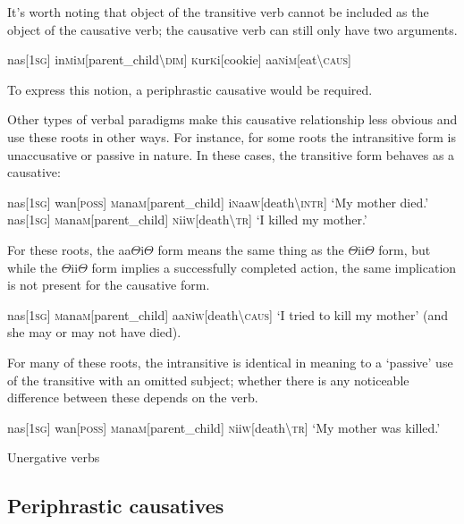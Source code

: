 \documentclass[a4paper,10pt,twoside,openright]{memoir}
\newcommand{\rootpart}{$\Theta$}
\newcommand{\famwordold}[5]{#1\textsc{#2}#3\textsc{#4}#5}
\begin{document}
It's worth noting that object of the transitive verb cannot be included as the object of the causative verb; the causative verb can still only have two arguments.

\ex
\ljudge{*}
\begingl
nas[\textsc{1sg}]
\famwordold{in}{m}{i}{m}{}[parent\_child\textbackslash\textsc{dim}]
\famwordold{}{k}{ur}{k}{i}[cookie]
\famwordold{aa}{n}{i}{m}{}[eat\textbackslash\textsc{caus}]
\endgl
\xe

\noindent To express this notion, a periphrastic causative would be required.

Other types of verbal paradigms make this causative relationship less obvious and use these roots in other ways. For instance, for some roots the intransitive form is unaccusative or passive in nature. In these cases, the transitive form behaves as a causative:

\pex
\a
\begingl
nas[\textsc{1sg}]
wan[\textsc{poss}]
\famwordold{}{m}{ana}{m}{}[parent\_child]
\famwordold{i}{n}{aa}{w}{}[death\textbackslash\textsc{intr}]
\glft `My mother died.'
\endgl
\a
\begingl
nas[\textsc{1sg}]
\famwordold{}{m}{ana}{m}{}[parent\_child]
\famwordold{}{n}{ii}{w}{}[death\textbackslash\textsc{tr}]
\glft `I killed my mother.'
\endgl
\xe

For these roots, the aa{\rootpart}i{\rootpart} form means the same thing as the {\rootpart}ii{\rootpart} form, but while the {\rootpart}ii{\rootpart} form implies a successfully completed action, the same implication is not present for the causative form.

\ex
\begingl
nas[\textsc{1sg}]
\famwordold{}{m}{ana}{m}{}[parent\_child]
\famwordold{aa}{n}{i}{w}{}[death\textbackslash\textsc{caus}]
\glft `I tried to kill my mother' (and she may or may not have died).
\endgl
\xe

\noindent For many of these roots, the intransitive is identical in meaning to a `passive' use of the transitive with an omitted subject; whether there is any noticeable difference between these depends on the verb.

\ex
\begingl
nas[\textsc{1sg}]
wan[\textsc{poss}]
\famwordold{}{m}{ana}{m}{}[parent\_child]
\famwordold{}{n}{ii}{w}{}[death\textbackslash\textsc{tr}]
\glft `My mother was killed.'
\endgl
\xe

Unergative verbs

\subsection{Periphrastic causatives}
\end{document}
